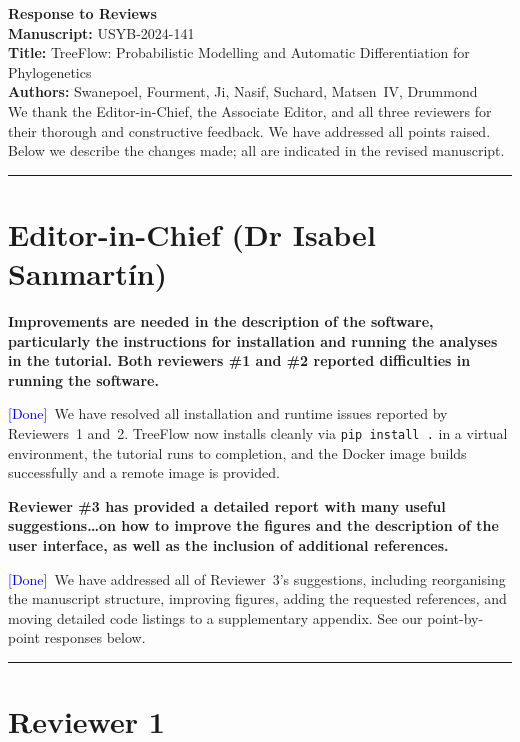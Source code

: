 \documentclass[11pt]{article}
\newcommand{\comment}[1]{\medskip\noindent\textbf{#1}\medskip}
\newcommand{\response}[1]{\noindent #1\medskip}
\newcommand{\done}{\textcolor{blue}{[Done]}}
\begin{document}
\noindent
\textbf{\Large Response to Reviews}\\[4pt]
\textbf{Manuscript:} USYB-2024-141\\
\textbf{Title:} TreeFlow: Probabilistic Modelling and Automatic Differentiation for Phylogenetics\\
\textbf{Authors:} Swanepoel, Fourment, Ji, Nasif, Suchard, Matsen~IV, Drummond\\[12pt]

\noindent
We thank the Editor-in-Chief, the Associate Editor, and all three reviewers for their thorough and constructive feedback. We have addressed all points raised. Below we describe the changes made; all are indicated in the revised manuscript.

\bigskip
\hrule
\bigskip

\section*{Editor-in-Chief (Dr Isabel Sanmart\'in)}

\comment{Improvements are needed in the description of the software, particularly the instructions for installation and running the analyses in the tutorial. Both reviewers \#1 and \#2 reported difficulties in running the software.}

\response{\done\ We have resolved all installation and runtime issues reported by Reviewers~1 and~2. TreeFlow now installs cleanly via \texttt{pip install .} in a virtual environment, the tutorial runs to completion, and the Docker image builds successfully and a remote image is provided.}

\comment{Reviewer \#3 has provided a detailed report with many useful suggestions\ldots on how to improve the figures and the description of the user interface, as well as the inclusion of additional references.}

\response{\done\ We have addressed all of Reviewer~3's suggestions, including reorganising the manuscript structure, improving figures, adding the requested references, and moving detailed code listings to a supplementary appendix. See our point-by-point responses below.}

\bigskip
\hrule
\bigskip

\section*{Reviewer 1}
\end{document}
